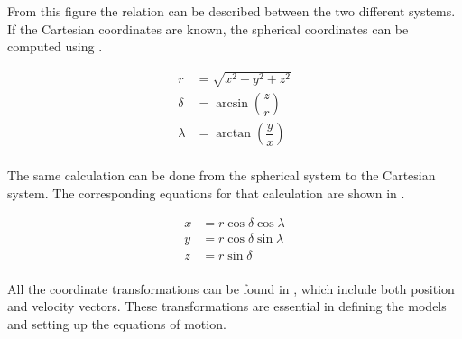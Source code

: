 From this figure the relation can be described between the two different systems. If the Cartesian coordinates are known, the spherical coordinates can be computed using .

\begin{equation} \label{eq:cart2spher}
\begin{split}
r &= \sqrt{x^{2}+y^{2}+z^{2}}\\
\delta &= \arcsin \left(\dfrac{z}{r}\right)\\
\lambda &= \arctan \left(\dfrac{y}{x}\right)\\
\end{split}
\end{equation}

The same calculation can be done from the spherical system to the Cartesian system. The corresponding equations for that calculation are shown in .

\begin{equation} \label{eq:spher2cart}
\begin{split}
x &= r\cos\delta\cos\lambda\\
y &= r\cos\delta\sin\lambda\\
z &= r\sin\delta\\
\end{split}
\end{equation}

All the coordinate transformations can be found in , which include both position and velocity vectors. These transformations are essential in defining the models and setting up the equations of motion.












